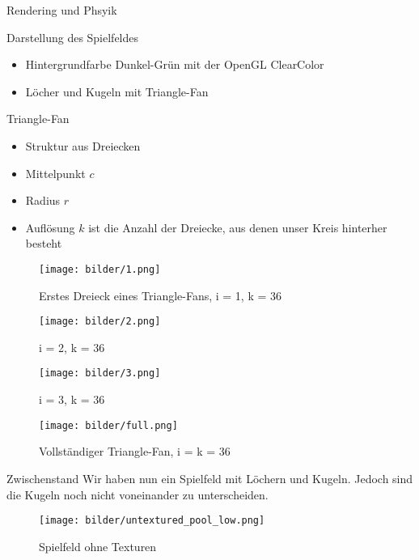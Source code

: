 \begin{frame}{Rendering und Phsyik}
\end{frame}
\begin{frame}{Darstellung des Spielfeldes}
\begin{itemize}
	\item Hintergrundfarbe Dunkel-Grün mit der OpenGL ClearColor
	\item Löcher und Kugeln mit Triangle-Fan
\end{itemize}
\end{frame}
\begin{frame}{Triangle-Fan}
\begin{itemize}
	\item Struktur aus Dreiecken
	\item Mittelpunkt $c$
	\item Radius $r$
	\item Auflösung $k$ ist die Anzahl der Dreiecke, aus denen unser Kreis hinterher besteht
\end{itemize}
\end{frame}
\begin{frame}
\begin{figure}
	\caption{Erstes Dreieck eines Triangle-Fans, i = 1, k = 36}
	\texttt{[image: bilder/1.png]}
\end{figure}
\end{frame}
\begin{frame}
\begin{figure}
	\caption{i = 2, k = 36}
	\texttt{[image: bilder/2.png]}
\end{figure}
\end{frame}
\begin{frame}
\begin{figure}
	\caption{i = 3, k = 36}
	\texttt{[image: bilder/3.png]}
\end{figure}
\end{frame}
\begin{frame}
\begin{figure}
	\caption{Vollständiger Triangle-Fan, i = k = 36}
	\texttt{[image: bilder/full.png]}
\end{figure}
\end{frame}
\begin{frame}{Zwischenstand}
Wir haben nun ein Spielfeld mit Löchern und Kugeln. Jedoch sind die Kugeln noch nicht voneinander zu unterscheiden.
\begin{figure}
	\caption{Spielfeld ohne Texturen}
	\texttt{[image: bilder/untextured\_pool\_low.png]}
\end{figure}
\end{frame}
